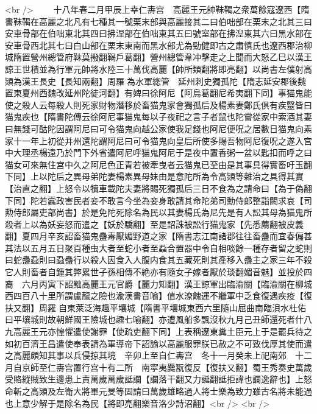 <br />
　　十八年春二月甲辰上幸仁夀宫　高麗王元帥靺鞨之衆萬餘寇遼西【隋書靺鞨在高麗之北凡有七種其一號栗末部與高麗接其二曰伯咄部在栗末之北其三曰安車骨部在伯咄東北其四曰拂涅部在伯咄東其五曰號室部在拂湼東其六曰黑水部在安車骨西北其七曰白山部在栗末東南而黑水部尤為勁健即古之肅慎氏也遼西郡治柳城隋置營州總管府靺莫撥翻鞨戶葛翻】營州總管韋冲擊走之上聞而大怒乙巳以漢王諒王世積並為行軍元帥將水陸三十萬伐高麗【帥所類翻將即亮翻】以尚書左僕射高熲為漢王長史【長知兩翻】周羅為水軍緫管　延州刺史獨孤陀【隋志延安郡後魏置東夏州西魏改延州陀徒河翻】有婢曰徐阿尼【阿烏葛翻尼希夷翻下同】事猫鬼能使之殺人云每殺人則死家財物潛移於畜猫鬼家會獨孤后及楊素妻鄭氏俱有疾毉皆曰猫鬼疾也【隋書陀傳云徐阿尼事猫鬼每以子夜祀之言子者鼠也陀嘗從家中索酒其妻曰無錢可酤陀因謂阿尼曰可令猫鬼向越公家使我足錢也阿尼便呪之居數日猫鬼向素家十一年上初從并州還陀謂阿尼曰可令猫鬼向皇后所使多賜吾物阿尼復呪之遂入宫中大理丞楊遠乃於門下外省遣阿尼呼猫鬼阿尼于是夜中置香粥一盆以匙扣而呼之曰猫女可來無住宫中久之阿尼色正青若被牽曳者云猫鬼已至由是其事具得實畜吁玉翻下同】上以陀后之異母弟陀妻楊素異母妹由是意陀所為令高熲等雜治之具得其實【治直之翻】上怒令以犢車載陀夫妻將賜死獨孤后三日不食為之請命曰【為于偽翻下同】陀若蠧政害民者妾不敢言今坐為妾身敢請其命陀弟司勳侍郎整詣闕求哀【司勲侍郎屬吏部尚書】於是免陀死除名為民以其妻楊氏為尼先是有人訟其母為猫鬼所殺者上以為妖妄怒而遣之【妖於驕翻】至是詔誅被訟行猫鬼家【先悉薦翻被皮義翻】夏四月辛亥詔畜猫鬼蠱毒厭媚野道之家【隋書志江南諸郡往往畜蠱而宜春偏甚其法以五月五日聚百種虫大者至蛇小者至蝨合置器中令自相啖餘一種存者留之蛇則曰蛇蠱蝨則曰蝨蠱行以殺人因食入人腹内食其五藏死則其產移入蠱主之家三年不殺它人則畜者自鍾其弊累世子孫相傳不絶亦有隨女子嫁者厭於琰翻媚音魅】並投於四裔　六月丙寅下詔黜高麗王元官爵【麗力知翻】漢王諒軍出臨渝關【臨渝關在柳城西四百八十里所謂盧龍之險也渝漢書音喻】值水潦餽運不繼軍中乏食復遇疾疫【復扶又翻】周羅自東萊泛海趣平壤城【隋書平壤城東西六里隨山屈曲南臨浿水杜佑曰平壤城則故朝鮮國王險城也趣七喻翻】亦遭風船多飄沒秋九月己丑師還死者什八九高麗王元亦惶懼遣使謝罪【使疏吏翻下同】上表稱遼東糞土臣元上于是罷兵待之如初百濟王昌遣使奉表請為軍導帝下詔諭以高麗服罪朕已赦之不可致伐厚其使而遣之高麗頗知其事以兵侵掠其境　辛卯上至自仁夀宫　冬十一月癸未上祀南郊　十二月自京師至仁夀宫置行宫十有二所　南寜夷爨翫復反【復扶又翻】蜀王秀奏史萬歲受賂縱賊致生邊患上責萬歲萬歲詆讕【讕落干翻又力誕翻詆拒諱也讕逸辭也】上怒命斬之高熲及左衛大將軍元旻等固請曰萬歲雄略過人將士樂為致力雖古名將未能過也上意少解于是除名為民【將即亮翻樂音洛少詩沼翻】<br />
<br />
